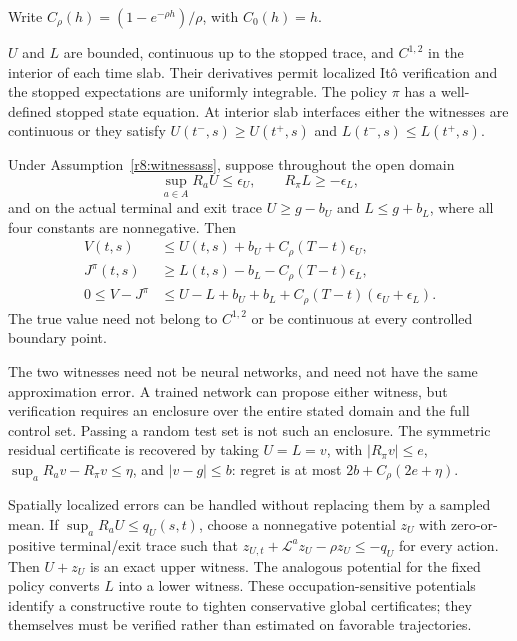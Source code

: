 Write $C_\rho(h)=(1-e^{-\rho h})/\rho$, with $C_0(h)=h$.
\begin{assumption}\label{r8:witnessass}
$U$ and $L$ are bounded, continuous up to the stopped trace, and $C^{1,2}$ in the interior of each time slab. Their derivatives permit localized It\^o verification and the stopped expectations are uniformly integrable. The policy $\pi$ has a well-defined stopped state equation. At interior slab interfaces either the witnesses are continuous or they satisfy $U(t^- ,s)\geq U(t^+,s)$ and $L(t^- ,s)\leq L(t^+,s)$.
\end{assumption}
\begin{theorem}\label{r8:pair}
Under Assumption~\ref{r8:witnessass}, suppose throughout the open domain
\[
 \sup_{a\in A}R_aU\leq\epsilon_U,\qquad R_\pi L\geq-\epsilon_L,
\]
and on the actual terminal and exit trace $U\geq g-b_U$ and $L\leq g+b_L$, where all four constants are nonnegative. Then
\begin{align}
 V(t,s)&\leq U(t,s)+b_U+C_\rho(T-t)\epsilon_U,\\
 J^\pi(t,s)&\geq L(t,s)-b_L-C_\rho(T-t)\epsilon_L,\\
 0\leq V-J^\pi&\leq U-L+b_U+b_L+C_\rho(T-t)(\epsilon_U+\epsilon_L).
 \label{r8:pairbound}
\end{align}
The true value need not belong to $C^{1,2}$ or be continuous at every controlled boundary point.
\end{theorem}
The two witnesses need not be neural networks, and need not have the same approximation error. A trained network can propose either witness, but verification requires an enclosure over the entire stated domain and the full control set. Passing a random test set is not such an enclosure. The symmetric residual certificate is recovered by taking $U=L=v$, with $|R_\pi v|\leq e$, $\sup_aR_av-R_\pi v\leq\eta$, and $|v-g|\leq b$: regret is at most $2b+C_\rho(2e+\eta)$.

Spatially localized errors can be handled without replacing them by a sampled mean. If $\sup_aR_aU\leq q_U(s,t)$, choose a nonnegative potential $z_U$ with zero-or-positive terminal/exit trace such that $z_{U,t}+\mathcal L^az_U-\rho z_U\leq-q_U$ for every action. Then $U+z_U$ is an exact upper witness. The analogous potential for the fixed policy converts $L$ into a lower witness. These occupation-sensitive potentials identify a constructive route to tighten conservative global certificates; they themselves must be verified rather than estimated on favorable trajectories.

